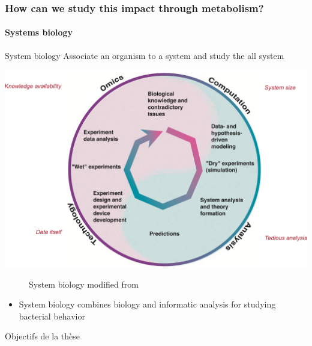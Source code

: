 \documentclass[8pt]{beamer}
\begin{document}
\begin{frame}
\frametitle{How can we study this impact through metabolism? }
\framesubtitle{Systems biology}
\begin{exampleblock}{System biology}
Associate an organism to a system and study the all system \tiny \citep{Kitano2002}
\end{exampleblock}
\begin{minipage}{0.8\textwidth}
\includegraphics[width=\textwidth]{figures/systeme-biology.pdf}
\end{minipage}%
\begin{minipage}{0.2\textwidth}
\begin{figure}
\caption{System biology modified from \cite{Kitano2002}}
\end{figure}
\end{minipage}
\vspace{-0.3cm}
\begin{block}{}
\begin{itemize}
\item System biology combines biology and informatic analysis for studying bacterial behavior
\end{itemize}
\end{block}
\end{frame}

\begin{frame}{Objectifs de la thèse}

\end{frame}

\tiny
\printbibliography
\end{document}
